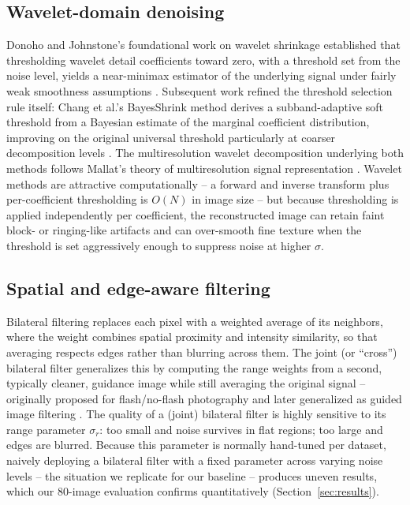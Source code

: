 \documentclass[final,3p,times,twocolumn,nopreprintline]{elsarticle}
\begin{document}
\subsection{Wavelet-domain denoising}
Donoho and Johnstone's foundational work on wavelet shrinkage established that thresholding wavelet detail coefficients toward zero, with a threshold set from the noise level, yields a near-minimax estimator of the underlying signal under fairly weak smoothness assumptions \cite{donoho1994ideal,donoho1995noising}. Subsequent work refined the threshold selection rule itself: Chang et al.'s BayesShrink method derives a subband-adaptive soft threshold from a Bayesian estimate of the marginal coefficient distribution, improving on the original universal threshold particularly at coarser decomposition levels \cite{chang2000adaptive}. The multiresolution wavelet decomposition underlying both methods follows Mallat's theory of multiresolution signal representation \cite{mallat1989theory}. Wavelet methods are attractive computationally -- a forward and inverse transform plus per-coefficient thresholding is $O(N)$ in image size -- but because thresholding is applied independently per coefficient, the reconstructed image can retain faint block- or ringing-like artifacts and can over-smooth fine texture when the threshold is set aggressively enough to suppress noise at higher $\sigma$.

\subsection{Spatial and edge-aware filtering}
Bilateral filtering \cite{tomasi1998bilateral} replaces each pixel with a weighted average of its neighbors, where the weight combines spatial proximity and intensity similarity, so that averaging respects edges rather than blurring across them. The joint (or ``cross'') bilateral filter generalizes this by computing the range weights from a second, typically cleaner, guidance image while still averaging the original signal -- originally proposed for flash/no-flash photography \cite{petschnigg2004digital} and later generalized as guided image filtering \cite{he2013guided}. The quality of a (joint) bilateral filter is highly sensitive to its range parameter $\sigma_r$: too small and noise survives in flat regions; too large and edges are blurred. Because this parameter is normally hand-tuned per dataset, naively deploying a bilateral filter with a fixed parameter across varying noise levels -- the situation we replicate for our baseline -- produces uneven results, which our 80-image evaluation confirms quantitatively (Section~\ref{sec:results}).
\end{document}
